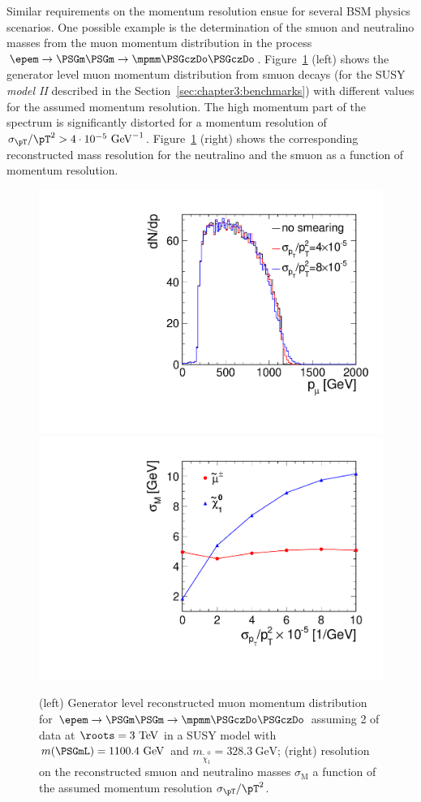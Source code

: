 Similar requirements on the momentum resolution ensue for several \acs{BSM} physics
scenarios. One possible example is the determination of the
smuon and neutralino masses from the muon momentum distribution in the process
$\epem\rightarrow\PSGm\PSGm\rightarrow\mpmm\PSGczDo\PSGczDo$.
Figure~\ref{fig:chap3:trackRequirements} (left) shows the generator level muon
momentum distribution from smuon decays (for the \acs{SUSY} \textit{model II} described in
the Section~\ref{sec:chapter3:benchmarks}) with different values for the assumed momentum
resolution. The high momentum part of the spectrum is significantly distorted
for a momentum resolution of $\sigma_{\pT}/\pT^2 >
4\cdot
10^{-5}~\textrm{GeV}^{-1}$. Figure~\ref{fig:chap3:trackRequirements} (right) shows the
corresponding reconstructed mass resolution for the neutralino and the smuon as
a function of momentum resolution.
\begin{figure}[hbt]
\centering
\includegraphics[width=0.49\linewidth]{../Chap3_ExpCond_PhysPerfsReqs/SleptonEndpoint.pdf} 
\includegraphics[width=0.49\linewidth]{../Chap3_ExpCond_PhysPerfsReqs/SleptonMassResolution.pdf}
\caption{(left) Generator level reconstructed muon momentum distribution for
  $\epem\rightarrow\PSGm\PSGm\rightarrow\mpmm\PSGczDo\PSGczDo$ assuming 2 \abinv
  of data at $\roots=3~\mathrm{TeV}$ in a SUSY model with $m(\PSGmL) =
  1100.4~\mathrm{GeV}$ and $m_{\tilde\chi_{1}^{0}}=328.3~\mathrm{GeV}$; (right)
  resolution on the reconstructed smuon and neutralino masses
  $\sigma_{\mathrm{M}}$ a function of the assumed momentum resolution
  $\sigma_{\pT}/\pT^{2}$. \label{fig:chap3:trackRequirements}}

\end{figure}


